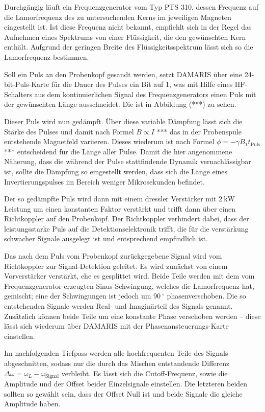 Durchgängig läuft ein Frequenzgenerator vom Typ PTS 310, dessen Frequenz auf die Lamorfrequenz des zu untersuchenden Kerns im jeweiligen Magneten eingestellt ist. Ist diese Frequenz nicht bekannt, empfiehlt sich in der Regel das Aufnehmen eines Spektrums von einer Flüssigkeit, die den gewünschten Kern enthält. Aufgrund der geringen Breite des Flüssigkeitsspektrum lässt sich so die Lamorfrequenz bestimmen.

Soll ein Puls an den Probenkopf gesandt werden, setzt DAMARIS über eine 24-bit-Puls-Karte für die Dauer des Pulses ein Bit auf 1, was mit Hilfe eines HF-Schalters aus dem kontinuierlichen Signal des Frequenzgenerators einen Puls mit der gewünschten Länge ausschneidet. Die ist in Abbildung (***) zu sehen.

Dieser Puls wird nun gedämpft. Über diese variable Dämpfung lässt sich die Stärke des Pulses und damit nach Formel $B \propto I$ *** das in der Probenspule entstehende Magnetfeld variieren. Dieses wiederum ist nach Formel $\phi = - \gamma B_1 t_\text{Puls}$ *** entscheidend für die Länge aller Pulse. Damit die hier angenommene Näherung, dass die während der Pulse stattfindende Dynamik vernachlässigbar ist, sollte die Dämpfung so eingestellt werden, dass sich die Länge eines Invertierungspulses im Bereich weniger Mikrosekunden befindet.

Der so gedämpfte Puls wird dann mit einem dressler Verstärker mit $\SI{2}{\kilo\watt}$ Leistung um einen konstanten Faktor verstärkt und trifft dann über einen Richtkoppler auf den Probenkopf. Der Richtkoppler verhindert dabei, dass der leistungsstarke Puls auf die Detektionselektronik trifft, die für die verstärkung schwacher Signale ausgelegt ist und entsprechend empfindlich ist.

Das nach dem Puls vom Probenkopf zurückgegebene Signal wird vom Richtkoppler zur Signal-Detektion geleitet. Es wird zunächst von einem Vorverstärker verstärkt, ehe es gesplittet wird. Beide Teile werden mit dem vom Frequenzgenerator erzeugten Sinus-Schwingung, welches die Lamorfrequenz hat, gemischt; eine der Schwingungen ist jedoch um $\SI{90}{^\circ}$ phasenverschoben. Die so entstehenden Signale werden Real- und Imaginärteil des Signals genannt. Zusätzlich können beide Teile um eine konstante Phase verschoben werden -- diese lässt sich wiederum über DAMARIS mit der Phasenansteuerungs-Karte einstellen.

Im nachfolgenden Tiefpass werden alle hochfrequenten Teile des Signals abgeschnitten, sodass nur die durch das Mischen entstandende Differenz $\Delta \omega = \omega_L - \omega_\text{Signal}$ verbleibt. Es lässt sich die Cutoff-Frequenz, sowie die Amplitude und der Offset beider Einzelsignale einstellen. Die letzteren beiden sollten so gewählt sein, dass der Offset Null ist und beide Signale die gleiche Amplitude haben.

